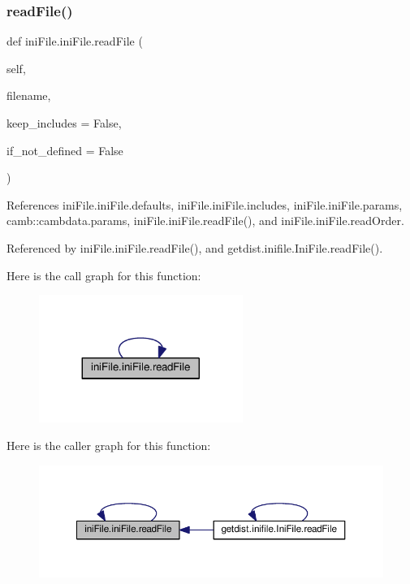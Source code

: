\subsubsection{\texorpdfstring{read\+File()}{readFile()}}
{\footnotesize\ttfamily def ini\+File.\+ini\+File.\+read\+File (\begin{DoxyParamCaption}\item[{}]{self,  }\item[{}]{filename,  }\item[{}]{keep\+\_\+includes = {\ttfamily False},  }\item[{}]{if\+\_\+not\+\_\+defined = {\ttfamily False} }\end{DoxyParamCaption})}



References ini\+File.\+ini\+File.\+defaults, ini\+File.\+ini\+File.\+includes, ini\+File.\+ini\+File.\+params, camb\+::cambdata.\+params, ini\+File.\+ini\+File.\+read\+File(), and ini\+File.\+ini\+File.\+read\+Order.



Referenced by ini\+File.\+ini\+File.\+read\+File(), and getdist.\+inifile.\+Ini\+File.\+read\+File().

Here is the call graph for this function\+:
\nopagebreak
\begin{figure}[H]
\begin{center}
\leavevmode
\includegraphics[width=188pt]{classiniFile_1_1iniFile_ae8d224f441caa05fe9ecad65bf2ed489_cgraph}
\end{center}
\end{figure}
Here is the caller graph for this function\+:
\nopagebreak
\begin{figure}[H]
\begin{center}
\leavevmode
\includegraphics[width=350pt]{classiniFile_1_1iniFile_ae8d224f441caa05fe9ecad65bf2ed489_icgraph}
\end{center}
\end{figure}
\mbox{\label{classiniFile_1_1iniFile_afd14693fddd1954ffe6c7a8157eaf2f5}} 
